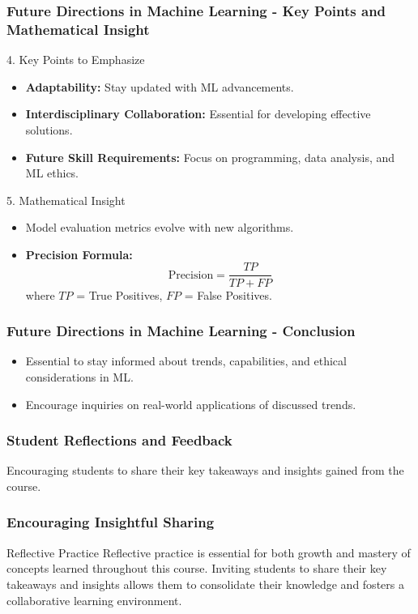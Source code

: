 \documentclass[aspectratio=169]{beamer}
\begin{document}
\begin{frame}[fragile]
    \frametitle{Future Directions in Machine Learning - Key Points and Mathematical Insight}
    \begin{block}{4. Key Points to Emphasize}
        \begin{itemize}
            \item \textbf{Adaptability:} Stay updated with ML advancements.
            \item \textbf{Interdisciplinary Collaboration:} Essential for developing effective solutions.
            \item \textbf{Future Skill Requirements:} Focus on programming, data analysis, and ML ethics.
        \end{itemize}
    \end{block}

    \begin{block}{5. Mathematical Insight}
        \begin{itemize}
            \item Model evaluation metrics evolve with new algorithms.
            \item \textbf{Precision Formula:} 
            \begin{equation}
            \text{Precision} = \frac{TP}{TP + FP}
            \end{equation}
            where \(TP\) = True Positives, \(FP\) = False Positives.
        \end{itemize}
    \end{block}
\end{frame}

\begin{frame}[fragile]
    \frametitle{Future Directions in Machine Learning - Conclusion}
    \begin{itemize}
        \item Essential to stay informed about trends, capabilities, and ethical considerations in ML.
        \item Encourage inquiries on real-world applications of discussed trends.
    \end{itemize}
\end{frame}

\begin{frame}[fragile]
    \frametitle{Student Reflections and Feedback}
    Encouraging students to share their key takeaways and insights gained from the course.
\end{frame}

\begin{frame}[fragile]
    \frametitle{Encouraging Insightful Sharing}
    \begin{block}{Reflective Practice}
        Reflective practice is essential for both growth and mastery of concepts learned throughout this course. Inviting students to share their key takeaways and insights allows them to consolidate their knowledge and fosters a collaborative learning environment.
    \end{block}
\end{frame}
\end{document}
